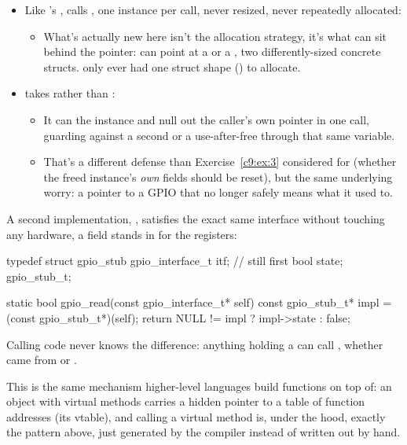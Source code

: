 \begin{itemize}
  \item Like 's ,  calls
    , one instance per call, never resized, never repeatedly allocated:
  \begin{itemize}
    \item What's actually new here isn't the allocation strategy, it's what can sit behind the
      pointer:  can point at a  or a
      , two differently-sized concrete structs.  only ever had
      one struct shape () to allocate.
  \end{itemize}
  \item {} takes  rather than :
  \begin{itemize}
    \item It can  the instance and null out the caller's own pointer in one call,
      guarding against a second  or a use-after-free through that same variable.
    \item That's a different defense than Exercise~\ref{c9:ex:3} considered for
       (whether the freed instance's \emph{own} fields should be reset), but the
      same underlying worry: a pointer to a GPIO that no longer safely means what it used to.
  \end{itemize}
\end{itemize}
A second implementation, , satisfies the exact same interface without touching
any hardware, a  field stands in for the registers:

\begin{ccode}
typedef struct gpio_stub
{
    gpio_interface_t itf;   // still first
    bool state;
} gpio_stub_t;

static bool gpio_read(const gpio_interface_t* self)
{
    const gpio_stub_t* impl = (const gpio_stub_t*)(self);
    return NULL != impl ? impl->state : false;
}
\end{ccode}

\noindent Calling code never knows the difference: anything holding a  can
call , whether  came from  or
.

This is the same mechanism higher-level languages build  functions on top of: an
object with virtual methods carries a hidden pointer to a table of function addresses (its vtable),
and calling a virtual method is, under the hood, exactly the  pattern
above, just generated by the compiler instead of written out by hand.

